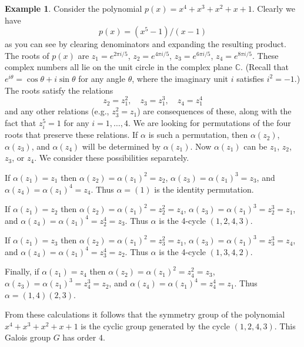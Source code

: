 \documentclass[11pt]{article}
\theoremstyle{definition}
\newtheorem{example}[thm]{Example}
\newcommand{\C}{\mathbb{C}} %
\begin{document}
\begin{example}\label{ex:1}
Consider the polynomial $p(x)=x^4+x^3+x^2+x+1$.  Clearly we have
$$
p(x) = (x^5-1)/(x-1)
$$ as you can see by clearing denominators and expanding the resulting
product. The roots of $p(x)$ are $z_1=e^{2\pi i/5}$, $z_2 = e^{4\pi
i/5}$, $z_3 = e^{6\pi i/5}$, $z_4= e^{8\pi i/5}$. These complex
numbers all lie on the unit circle in the complex plane $\C$. (Recall
that $e^{i \theta} = \cos \theta + i \sin \theta$ for any angle
$\theta$, where the imaginary unit $i$ satisfies $i^2 = -1$.)
The roots satisfy the relations
$$
 z_2 = z_1^2, \quad z_3 = z_1^3, \quad z_4 = z_1^4 
$$ and any other relations (e.g., $z_3^2 = z_1$) are consequences of
these, along with the fact that $z_i^5 = 1$ for any $i = 1, \dots,
4$. We are looking for permutations of the four roots that preserve
these relations. If $\alpha$ is such a permutation, then
$\alpha(z_2)$, $\alpha(z_3)$, and $\alpha(z_4)$ will be determined by
$\alpha(z_1)$. Now $\alpha(z_1)$ can be $z_1$, $z_2$, $z_3$, or $z_4$.
We consider these possibilities separately.

If $\alpha(z_1)=z_1$ then $\alpha(z_2) = \alpha(z_1)^2 = z_2$,
$\alpha(z_3) = \alpha(z_1)^3 = z_3$, and $\alpha(z_4) = \alpha(z_1)^4
= z_4$. Thus $\alpha = (1)$ is the identity
permutation. 

If $\alpha(z_1)=z_2$ then $\alpha(z_2) = \alpha(z_1)^2 = z_2^2 = z_4$,
$\alpha(z_3) = \alpha(z_1)^3 = z_2^3 = z_1$, and $\alpha(z_4) =
\alpha(z_1)^4 = z_2^4 = z_3$. Thus $\alpha$ is the 4-cycle
$(1,2,4,3)$.

If $\alpha(z_1)=z_3$ then $\alpha(z_2) = \alpha(z_1)^2 = z_3^2 = z_1$,
$\alpha(z_3) = \alpha(z_1)^3 = z_3^3 = z_4$, and $\alpha(z_4) =
\alpha(z_1)^4 = z_3^4 = z_2$. Thus $\alpha$ is the 4-cycle
$(1,3,4,2)$.

Finally, if $\alpha(z_1)=z_4$ then $\alpha(z_2) = \alpha(z_1)^2 =
z_4^2 = z_3$, $\alpha(z_3) = \alpha(z_1)^3 = z_4^3 = z_2$, and
$\alpha(z_4) = \alpha(z_1)^4 = z_4^4 = z_1$. Thus $\alpha =
(1,4)(2,3)$.

From these calculations it follows that the symmetry group of the
polynomial $x^4+x^3+x^2+x+1$ is the cyclic group generated by
the cycle $(1,2,4,3)$. This Galois group $G$ has order $4$. 
\end{example}
\end{document}
